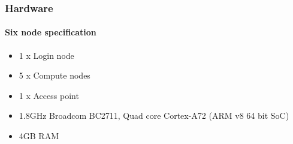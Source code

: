 \begin{frame}
	\frametitle{Hardware}
	\framesubtitle{Six node specification}
	\begin{itemize}
		\item 1 x Login node
		\item 5 x Compute nodes
		\item 1 x Access point
		\item 1.8GHz Broadcom BC2711, Quad core Cortex-A72 (ARM v8 64 bit SoC)
		\item 4GB RAM
		\
	\end{itemize}
\end{frame}
